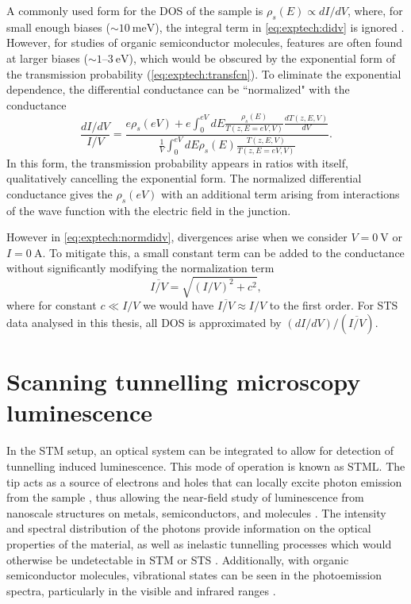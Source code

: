 A commonly used form for the \ac{DOS} of the sample is $\rho_s(E) \propto dI/dV $, where, for small enough biases ($\sim \SI{10}{\milli\electronvolt}$), the integral term in \autoref{eq:exptech:didv} is ignored \citep{feenstra1993methods}. However, for studies of organic semiconductor molecules, features are often found at larger biases ($\sim 1$--$\SI{3}{\electronvolt}$), which would be obscured by the exponential form of the transmission probability (\autoref{eq:exptech:transfcn}). To eliminate the exponential dependence, the differential conductance can be ``normalized" with the conductance  \citep{feenstra1987atom}
\begin{equation} \label{eq:exptech:normdidv}
\frac{dI/dV}{I/V} = \frac{e\rho_s(eV) + e\int_0 ^{eV} dE \frac{\rho_s(E)}{T(z,E=eV,V)} \frac{dT(z,E,V)}{dV}}{ \frac{1}{V} \int_0^{eV} dE \rho_s(E) \frac{T(z,E,V)}{T(z,E=eV,V)}}.
\end{equation}
In this form, the transmission probability appears in ratios with itself, qualitatively cancelling the exponential form. The normalized differential conductance gives the $\rho_s(eV)$ with an additional term arising from interactions of the wave function with the electric field in the junction.

However in \autoref{eq:exptech:normdidv}, divergences arise when we consider $V=\SI{0}{\volt}$ or $I= \SI{0}{\ampere}$. To mitigate this, a small constant term can be added to the conductance without significantly modifying the normalization term \citep{prietsch1991structural}
\begin{equation}
    \overline{I/V} = \sqrt{(I/V)^2 + c^2},
\end{equation}
where for constant $c\ll I/V$ we would have $\overline{I/V} \approx I/V$ to the first order. For \ac{STS} data analysed in this thesis, all \ac{DOS} is approximated by $ (dI/dV) / (\overline{I/V})$.

\section{Scanning tunnelling microscopy luminescence}

In the \ac{STM} setup, an optical system can be integrated to allow for detection of tunnelling induced luminescence. This mode of operation is known as \acf{STML}. The tip acts as a source of electrons and holes that can locally excite photon emission from the sample \citep{gimzewski1988photon}, thus allowing the near-field study of luminescence from nanoscale structures on metals, semiconductors, and molecules \citep{Qiu2003}. The intensity and spectral distribution of the photons provide information on the optical properties of the material, as well as inelastic tunnelling processes which would otherwise be undetectable in \ac{STM} or \ac{STS} \citep{novotny2012principles}. Additionally, with organic semiconductor molecules, vibrational states can be seen in the photoemission spectra, particularly in the visible and infrared ranges \citep{Qiu2003,Wu2008}.

